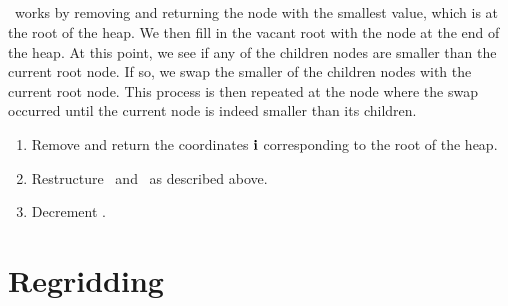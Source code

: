 \subsection{\RMVNODE}
\RMVNODE~works by removing and returning the node with the smallest value, which is at the root of the heap. We then fill in the vacant root with the node at the end of the heap. At this point, we see if any of the children nodes are smaller than the current root node. If so, we swap the smaller of the children nodes with the current root node. This process is then repeated at the node where the swap occurred until the current node is indeed smaller than its children.
\begin{enumerate}
\item Remove and return the coordinates ${\bf i}$ corresponding to the root of the heap.
\item Restructure \heap~and \heaploc~as described above.
\item Decrement \numtent.
\end{enumerate}
\section{Regridding}
